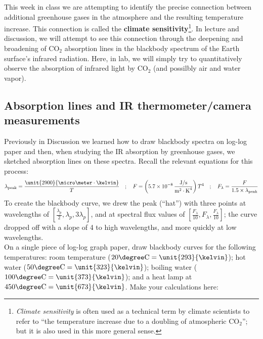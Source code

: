 This week in class we are attempting to identify the precise connection between additional greenhouse gases in the atmosphere and the resulting temperature increase.  This connection is called the {\bf climate sensitivity}\footnote{{\em Climate sensitivity} is often used as a technical term by climate scientists to refer to ``the temperature increase due to a doubling of atmospheric $\text{CO}_2$''; but it is also used in this more general sense.}.  In lecture and discussion, we will attempt to see this connection through the deepening and broadening of $\text{CO}_2$ absorption lines in the blackbody spectrum of the Earth surface's infrared radiation. Here, in lab, we will simply try to quantitatively observe the absorption of infrared light by $\text{CO}_2$ (and possilbly air and water vapor).

\subsection{Absorption lines and IR thermometer/camera measurements}

Previously in Discussion we learned how to draw blackbody spectra on log-log paper and then, when studying the IR absorption by greenhouse gases, we sketched absorption lines on these spectra.  Recall the relevant equations for this process:
	\begin{equation*}
	\lambda_\text{peak} = \frac{\unit{2900}{\micro\meter \cdot \kelvin}}{T}  \quad ; \quad
	F = \left( 5.7 \times 10^{-8} \, \frac{\text{J}/\text{s}}{\text{m}^2 \cdot \text{K}^4}\right) T^4 \quad ; \quad
	F_\lambda = \frac{F}{1.5 \times \lambda_\text{peak}}
	\end{equation*}
To create the blackbody curve, we drew the peak (``hat'') with three points at wavelengths of $[ \frac{\lambda_p}{2}, \lambda_p, 3 \lambda_p]$, and at spectral flux values of $[\frac{F_\lambda}{10}, F_\lambda, \frac{F_\lambda}{10} ]$; the curve dropped off with a slope of 4 to high wavelengths, and more quickly at low wavelengths.\\[6pt]

\noindent On a single piece of log-log graph paper, draw blackbody curves for the following temperatures: room temperature ($20\degree\text{C} = \unit{293}{\kelvin}$); hot water ($50\degree\text{C} = \unit{323}{\kelvin}$); boiling water ($100\degree\text{C} = \unit{373}{\kelvin}$); and a heat lamp at $450\degree\text{C} = \unit{673}{\kelvin}$. Make your calculations here:


\answerspace[7cm]

